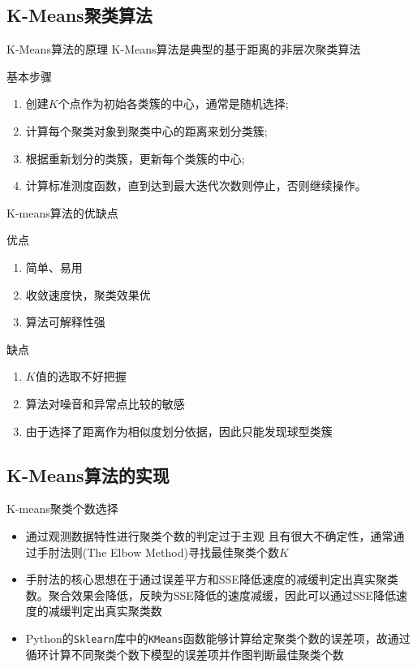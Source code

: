 \documentclass[t]{beamer}
\begin{document}
\subsection{K-Means聚类算法}


\begin{frame}[fragile]{K-Means算法的原理}
  K-Means算法是典型的基于距离的非层次聚类算法

  \begin{block}{基本步骤}
\begin{enumerate}
  \item 创建$K$个点作为初始各类簇的中心，通常是随机选择; 
  \item 计算每个聚类对象到聚类中心的距离来划分类簇; 
  \item 根据重新划分的类簇，更新每个类簇的中心; 
  \item 计算标准测度函数，直到达到最大迭代次数则停止，否则继续操作。
\end{enumerate}
  \end{block}
\end{frame}


\begin{frame}[fragile]{K-means算法的优缺点}
\begin{block}{优点}
\begin{enumerate}
  \item 简单、易用
  \item 收敛速度快，聚类效果优 
  \item 算法可解释性强
\end{enumerate}
\end{block}
\begin{block}{缺点}
  \begin{enumerate}
    \item  $K$值的选取不好把握
    \item  算法对噪音和异常点比较的敏感
    \item  由于选择了距离作为相似度划分依据，因此只能发现球型类簇
  \end{enumerate}
\end{block}
\end{frame}

\subsection{K-Means算法的实现}



\begin{frame}[fragile]{K-means聚类个数选择}
\begin{itemize}
  \item 通过观测数据特性进行聚类个数的判定过于主观 且有很大不确定性，通常通过手肘法则(The Elbow Method)寻找最佳聚类个数$K$
  \item 手肘法的核心思想在于通过误差平方和SSE降低速度的减缓判定出真实聚类数。聚合效果会降低，反映为SSE降低的速度减缓，因此可以通过SSE降低速度的减缓判定出真实聚类数
  \item Python的\verb|Sklearn|库中的\verb|KMeans|函数能够计算给定聚类个数的误差项，故通过循环计算不同聚类个数下模型的误差项并作图判断最佳聚类个数
\end{itemize}
\end{frame}
\end{document}
